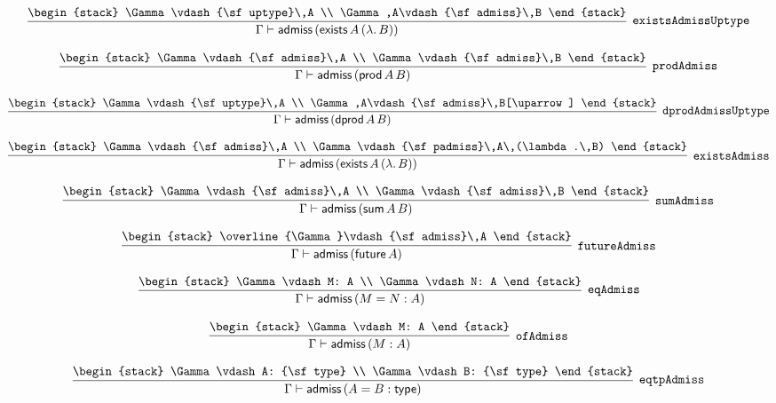 \[
\infer[{\tt existsAdmissUptype}]{\Gamma \vdash {\sf admiss}\,({\sf exists}\,A\,(\lambda .\,B))}{
\begin{stack}
\Gamma \vdash {\sf uptype}\,A
\\
\Gamma ,A\vdash {\sf admiss}\,B
\end{stack}}
\]

\[
\infer[{\tt prodAdmiss}]{\Gamma \vdash {\sf admiss}\,({\sf prod}\,A\,B)}{
\begin{stack}
\Gamma \vdash {\sf admiss}\,A
\\
\Gamma \vdash {\sf admiss}\,B
\end{stack}}
\]

\[
\infer[{\tt dprodAdmissUptype}]{\Gamma \vdash {\sf admiss}\,({\sf dprod}\,A\,B)}{
\begin{stack}
\Gamma \vdash {\sf uptype}\,A
\\
\Gamma ,A\vdash {\sf admiss}\,B[\uparrow ]
\end{stack}}
\]

\[
\infer[{\tt existsAdmiss}]{\Gamma \vdash {\sf admiss}\,({\sf exists}\,A\,(\lambda .\,B))}{
\begin{stack}
\Gamma \vdash {\sf admiss}\,A
\\
\Gamma \vdash {\sf padmiss}\,A\,(\lambda .\,B)
\end{stack}}
\]

\[
\infer[{\tt sumAdmiss}]{\Gamma \vdash {\sf admiss}\,({\sf sum}\,A\,B)}{
\begin{stack}
\Gamma \vdash {\sf admiss}\,A
\\
\Gamma \vdash {\sf admiss}\,B
\end{stack}}
\]

\[
\infer[{\tt futureAdmiss}]{\Gamma \vdash {\sf admiss}\,({\sf future}\,A)}{
\begin{stack}
\overline{\Gamma}\vdash {\sf admiss}\,A
\end{stack}}
\]

\[
\infer[{\tt eqAdmiss}]{\Gamma \vdash {\sf admiss}\,(M= N: A)}{
\begin{stack}
\Gamma \vdash M: A
\\
\Gamma \vdash N: A
\end{stack}}
\]

\[
\infer[{\tt ofAdmiss}]{\Gamma \vdash {\sf admiss}\,(M: A)}{
\begin{stack}
\Gamma \vdash M: A
\end{stack}}
\]

\[
\infer[{\tt eqtpAdmiss}]{\Gamma \vdash {\sf admiss}\,(A= B: {\sf type})}{
\begin{stack}
\Gamma \vdash A: {\sf type}
\\
\Gamma \vdash B: {\sf type}
\end{stack}}
\]

